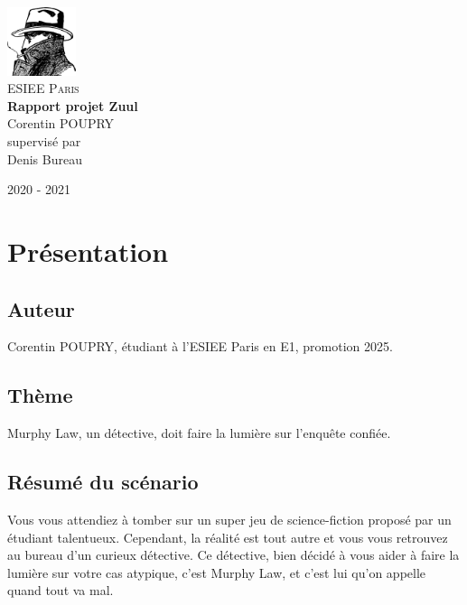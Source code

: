 \documentclass[a4paper,12pt]{report}
\begin{document}
\begin{titlepage}
	\centering
	\includegraphics[width=0.15\textwidth]{../media/murphy.png}\\
	\vspace{1cm}
	{\scshape\LARGE ESIEE Paris \\}
	\vspace{2.5cm}
	{\huge\bfseries Rapport projet Zuul\\}
	\vspace{2cm}
	{\Large Corentin POUPRY\\}
	\vfill
	supervisé par\\
	Denis Bureau

	\vfill
	
	{\large 2020 - 2021\\}
\end{titlepage}

\tableofcontents


\chapter{Présentation}

\section{Auteur}

\noindent
Corentin POUPRY, étudiant à l'ESIEE Paris en E1, promotion 2025.

\section{Thème}

\noindent
Murphy Law, un détective, doit faire la lumière sur l'enquête confiée.

\section{Résumé du scénario}

Vous vous attendiez à tomber sur un super jeu de science-fiction proposé par un étudiant talentueux. Cependant, la réalité est tout autre et vous vous retrouvez au bureau d'un curieux détective. Ce détective, bien décidé à vous aider à faire la lumière sur votre cas atypique, c'est Murphy Law, et c'est lui qu'on appelle quand tout va mal.
\end{document}
